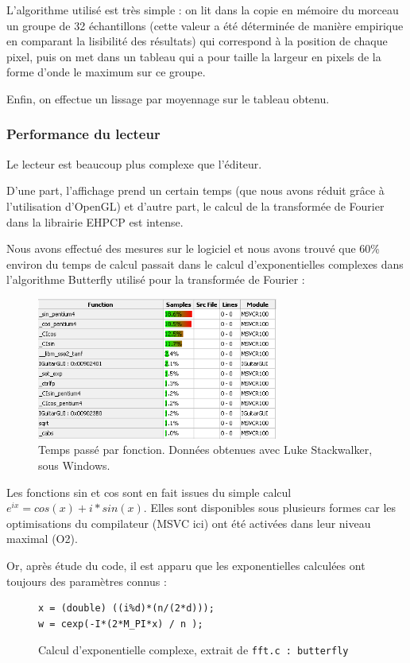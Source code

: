 L'algorithme utilisé est très simple : on lit dans la copie en mémoire du morceau un groupe de 32 échantillons
(cette valeur a été déterminée de manière empirique en comparant la lisibilité des résultats) qui correspond à la position de
chaque pixel, puis on met dans un tableau qui a pour taille la largeur en pixels de la forme d'onde le maximum sur ce groupe.

Enfin, on effectue un lissage par moyennage sur le tableau obtenu.

\subsubsection{Performance du lecteur}
Le lecteur est beaucoup plus complexe que l'éditeur.

D'une part, l'affichage prend un certain temps (que nous avons réduit grâce à l'utilisation d'OpenGL)
et d'autre part, le calcul de la transformée de Fourier dans la librairie EHPCP est intense.

Nous avons effectué des mesures sur le logiciel et nous avons trouvé que 60\% environ du temps de calcul
passait dans le calcul d'exponentielles complexes dans l'algorithme Butterfly utilisé pour la transformée de Fourier :

\begin{figure}[H]
\begin{center}
\includegraphics[width=300px]{sincos.png}
\caption{Temps passé par fonction. Données obtenues avec Luke Stackwalker, sous Windows.}
\label{player_performance}
\end{center}
\end{figure}

Les fonctions sin et cos sont en fait issues du simple calcul $e^{ix} = cos(x) + i*sin(x)$.
Elles sont disponibles sous plusieurs formes car les optimisations du compilateur (\ac{MSVC} ici) ont été activées dans leur niveau maximal (O2).

Or, après étude du code, il est apparu que les exponentielles calculées ont toujours des paramètres connus :
\begin{figure}[H]
\begin{lstlisting}
x = (double) ((i%d)*(n/(2*d)));
w = cexp(-I*(2*M_PI*x) / n );
\end{lstlisting}
\caption{Calcul d'exponentielle complexe, extrait de \texttt{fft.c : butterfly}}
\label{api_cexp}
\end{figure}

